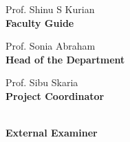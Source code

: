 \noindent 
\begin{minipage}[t]{0.5\textwidth}
\begin{flushleft}
Prof. Shinu S Kurian \\
\textbf{Faculty Guide}
\end{flushleft}
\end{minipage}%
\begin{minipage}[t]{0.5\textwidth}
\begin{flushright}
Prof. Sonia Abraham \\
\textbf{Head of the Department}
\end{flushright}
\end{minipage}

\vspace{1.5cm}

\noindent 
\begin{minipage}[t]{0.5\textwidth}
\begin{flushleft}
Prof. Sibu Skaria \\
\textbf{Project Coordinator}
\end{flushleft}
\end{minipage}%
\begin{minipage}[t]{0.5\textwidth}
\begin{flushright}
~ \\
\textbf{External Examiner}
\end{flushright}
\end{minipage}

\newpage
